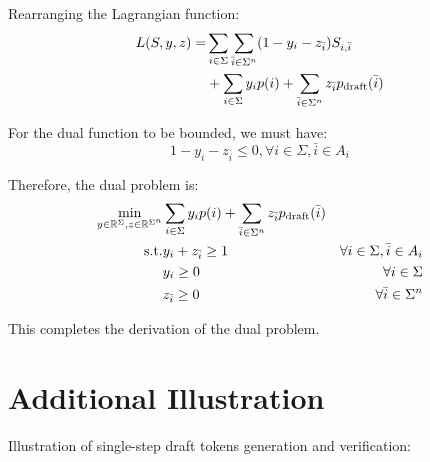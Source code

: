 \documentclass{article}
\begin{document}
Rearranging the Lagrangian function:
\begin{align}
L(S,y,z)=&\sum_{i\in\Sigma} \sum_{\bar{i}\in \Sigma^n} (1-y_i-z_{\bar{i}}) S_{i,\bar{i}}\\
&+\sum_{i\in\Sigma} y_i p(i)+\sum_{\bar{i}\in\Sigma^n} z_{\bar{i}} p_{\operatorname{draft}}(\bar{i})
\end{align}

For the dual function to be bounded, we must have:
\begin{equation}
1-y_i-z_{\bar{i}}\leq0, \forall i\in\Sigma,\bar{i}\in A_i
\end{equation}

Therefore, the dual problem is:
\begin{equation}
\begin{aligned}
\min_{y\in\mathbb{R}^{\Sigma},z\in\mathbb{R}^{\Sigma^n}} & \sum_{i\in\Sigma} y_i p(i)+ \sum_{\bar{i}\in\Sigma^n} z_{\bar{i}} p_{\operatorname{draft}}(\bar{i}) &
\\
\text{s.t.} & y_i+z_{\bar{i}}\geq1 & \forall i\in\Sigma,\bar{i}\in A_i
\\
& y_i\geq 0& \forall i\in\Sigma
\\
& z_{\bar{i}}\geq 0& \forall \bar{i}\in\Sigma^n
\end{aligned}
\end{equation}

This completes the derivation of the dual problem.
  

\section{Additional Illustration}\label{sec:add_ill}
Illustration of single-step draft tokens generation and verification:
\end{document}
